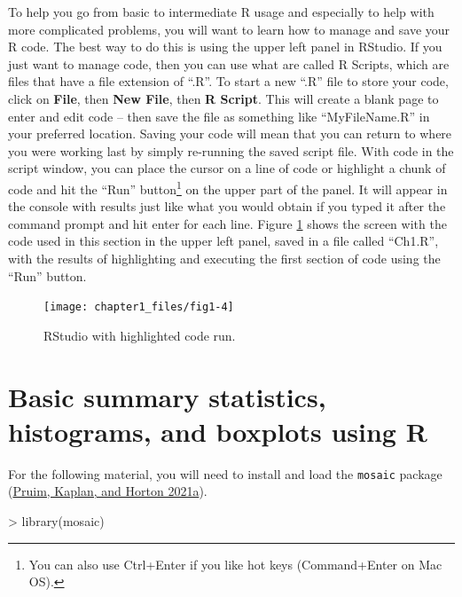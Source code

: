 \documentclass[
]{book}
\newenvironment{Shaded}{\begin{snugshade}}{\end{snugshade}}
\newcommand{\FunctionTok}[1]{\textcolor[rgb]{0.00,0.00,0.00}{#1}}
\newcommand{\NormalTok}[1]{#1}
\newcommand{\SpecialCharTok}[1]{\textcolor[rgb]{0.00,0.00,0.00}{#1}}
\begin{document}
\indent To help you go from basic to intermediate R usage and especially to help with more
complicated problems, you will want to learn how to manage and save your R code.
The best way to do this is using the upper left panel in RStudio. If you just want to manage code, then you can use what
are called R Scripts, which are files that have a file extension of ``.R''. To
start a new ``.R'' file to store your code, click on \textbf{File}, then
\textbf{New File}, then \textbf{R Script}. This will create a blank page to enter and
edit code -- then save the file as something like ``MyFileName.R'' in your preferred location.
Saving your code will mean that you can return to where you
were working last by simply re-running the saved script file. With code in the
script window, you can place the cursor on a line of code or highlight a chunk
of code and hit the ``Run'' button\footnote{You can also use Ctrl+Enter if you like hot keys (Command+Enter on Mac OS).}
on the upper part of the panel. It will appear
in the console with results just like what you would obtain if you typed it
after the command prompt and hit enter for each line. Figure \ref{fig:Figure1-4}
shows the screen with the code used in this
section in the upper left panel, saved in
a file called ``Ch1.R'', with the results of highlighting and executing the first
section of code using the ``Run'' button.



\begin{figure}[ht!]

{\centering \texttt{[image: chapter1\_files/fig1-4]} 

}

\caption{RStudio with highlighted code run.}\label{fig:Figure1-4}
\end{figure}

\hypertarget{section1-3}{%
\section{Basic summary statistics, histograms, and boxplots using R}\label{section1-3}}

For the following material, you will need to install and load the \texttt{mosaic} package (\protect\hyperlink{ref-R-mosaic}{Pruim, Kaplan, and Horton 2021a}).


\begin{Shaded}
\begin{Highlighting}[]
\SpecialCharTok{\textgreater{}} \FunctionTok{library}\NormalTok{(mosaic)}
\end{Highlighting}
\end{Shaded}
\end{document}
